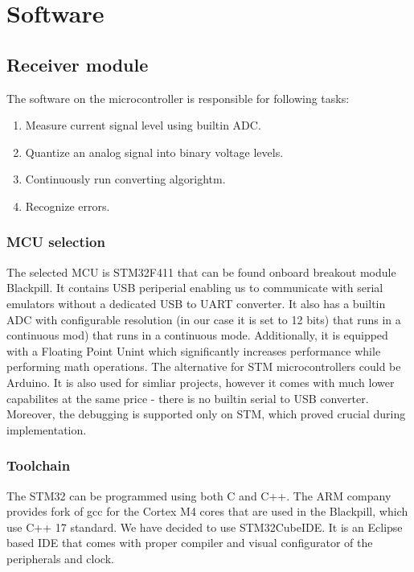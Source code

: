 \documentclass[12pt]{article}
\begin{document}
	\newpage
  \section{Software}
	\subsection{Receiver module}
  The software on the microcontroller is responsible for following tasks:
  \begin{enumerate}
    \item Measure current signal level using builtin ADC.
    \item Quantize an analog signal into binary voltage levels.
    \item Continuously run converting algorightm.
    \item Recognize errors.
  \end{enumerate}

  \subsubsection{MCU selection}
  The selected MCU is STM32F411 that can be found onboard breakout module Blackpill. It contains USB periperial enabling us to communicate with serial emulators without a 
  dedicated USB to UART converter. It also has a builtin ADC with configurable resolution (in our case it is set to 12 bits) that runs in a continuous mod) that runs in a continuous mode.
  Additionally, it is equipped with a Floating Point Unint which significantly increases performance while performing math operations.
  The alternative for STM microcontrollers could be Arduino. It is also used for simliar projects, however it comes with much lower capabilites at the same price - there is no builtin serial to USB converter.
  Moreover, the debugging is supported only on STM, which proved crucial during implementation.

  \subsubsection{Toolchain}
  The STM32 can be programmed using both C and C++. The ARM company provides fork of gcc for the Cortex M4 cores that are used in the Blackpill, which use C++ 17 standard.
  We have decided to use STM32CubeIDE. It is an Eclipse based IDE that comes with proper compiler and visual configurator of the peripherals and clock. 
\end{document}
